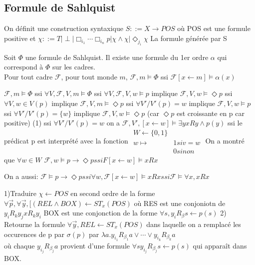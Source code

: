 \documentclass[10pt,a4paper]{article}
\newcommand{\F}{\mathcal{F}}
\begin{document}
\subsection{Formule de Sahlquist}
On définit une construction syntaxique 
$S ::= X \rightarrow POS$
où POS est une formule positive et $\chi ::= T | \perp | \Box_{i_1} \cdots \Box_{i_n}p | \chi \wedge \chi | \Diamond_{j_i} \chi$
La formule générée par S
\begin{thm}{} Soit $\Phi$ une formule de Sahlquist. Il existe une formule du 1er ordre $\alpha$ qui correspond à $\Phi$ sur les cadres.\\
Pour tout cadre $\F$, pour tout monde $m$,
$\F, m \models \Phi$ ssi $\F[x \leftarrow m] \models \alpha(x)$
\end{thm}
\begin{ex}{1}
$ \F, m \models \Phi$ ssi $\forall V, \F, V, m \models \Phi$
ssi $\forall V, \F, V, w \models p$ implique $\F, V, w \models \Diamond p$
ssi $\forall V, w \in V(p)$ implique $\F, V, m \models \Diamond p$
ssi $\forall V' / V'(p) = {w}$ implique $\F, V, w \models p$
ssi $\forall V' / V'(p) = \{ w \}$ implique $\F, V, w \models \Diamond p$
(car $\Diamond p$ est croissante en p car positive)
(1) ssi $\forall V' / V'(p) = w$ on a $\F, V', [x \leftarrow w ] \models \exists y xRy \wedge p(y)$
ssi le prédicat p est interprété avec la fonction 
$\begin{array}{ll}
 W \longleftarrow \{0, 1\}\\
 w \mapsto & 1 si v = w\\
	    & 0 sinon
\end{array}$
On a montré que $\forall w \in W$
$\F, w \models p \to \Diamond p ssi F[x \leftarrow w] \models x Rx$

On a aussi:
$\F \models p \to \Diamond p ssi \forall w, \F[x←w] \models xRx
			    ssi \F \models \forall x, xRx$
\end{ex}

1)Traduire $\chi \leftarrow POS$ en second ordre de la forme
$\forall \vec p, \forall \vec y, [(REL \wedge BOX) \leftarrow ST_x(POS)$
où RES est une conjoniotn de $y_i R_k y_j x R_k y_i$
   BOX est une conjonction de la forme $\forall s, y_i R_{\beta} s \leftarrow p(s)$
2) Retourne la formule $\forall \vec y, REL \leftarrow ST_x(POS)$ dans laquelle on a remplacé les occurences de p par 
$\sigma(p)$ par $\lambda a . y_{i_1} R_{\beta_1} a \vee \cdots \vee y_{i_k} R_{\beta_k} a$\\
où chaque $y_{i_j} R_{\beta_j} a$ provient d'une formule $\forall s y_{i_j} R_{\beta_j} s \leftarrow p(s)$ qui apparaît dans BOX.
\end{document}

